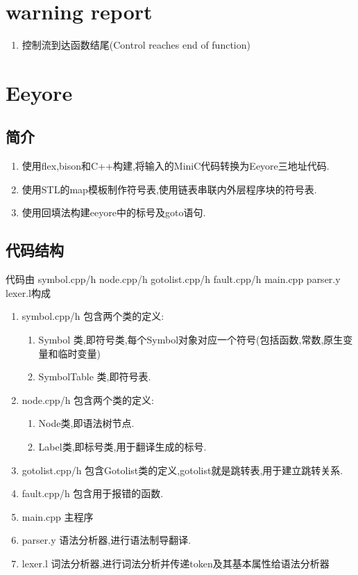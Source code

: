 \documentclass[UTF8]{article}
\begin{document}
\section{warning report}
\begin{enumerate}
\item 控制流到达函数结尾(Control reaches end of function)
\end{enumerate}
\section{Eeyore}
\subsection{简介}
\begin{enumerate}[1.]
\item 使用flex,bison和C++构建,将输入的MiniC代码转换为Eeyore三地址代码.
\item 使用STL的map模板制作符号表,使用链表串联内外层程序块的符号表.
\item 使用回填法构建eeyore中的标号及goto语句.
\end{enumerate}
\subsection{代码结构}
代码由 symbol.cpp/h node.cpp/h gotolist.cpp/h fault.cpp/h main.cpp parser.y lexer.l构成
\begin{enumerate}
\item symbol.cpp/h 包含两个类的定义:
\begin{enumerate}[(1)]
\item Symbol 类,即符号类,每个Symbol对象对应一个符号(包括函数,常数,原生变量和临时变量)
\item SymbolTable 类,即符号表.
\end{enumerate}
\item node.cpp/h 包含两个类的定义:
\begin{enumerate}[(1)]
\item Node类,即语法树节点.
\item Label类,即标号类,用于翻译生成的标号.
\end{enumerate}
\item gotolist.cpp/h 包含Gotolist类的定义,gotolist就是跳转表,用于建立跳转关系.
\item fault.cpp/h 包含用于报错的函数.
\item main.cpp 主程序
\item parser.y 语法分析器,进行语法制导翻译.
\item lexer.l 词法分析器,进行词法分析并传递token及其基本属性给语法分析器
\end{enumerate}
\end{document}

